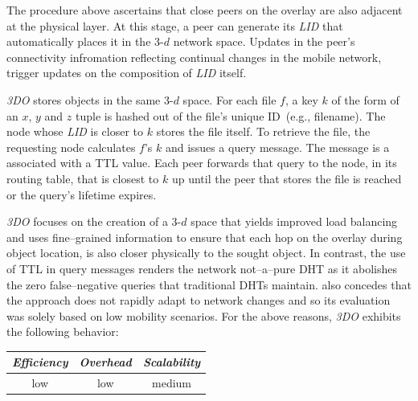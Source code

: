 The procedure above ascertains that close peers on the
overlay are also adjacent at the physical layer. 
At this stage, a peer can generate its \emph{LID}
that automatically places it in the $3$-$d$ network space.
Updates in the peer's connectivity infromation 
reflecting continual changes in the mobile network,
trigger updates on the composition of \emph{LID} itself.

\emph{3DO} stores objects in the same $3$-$d$ space. For each
file $f$, a key $k$ of the form of an $x$, $y$ and $z$ tuple
is hashed out of the file's unique ID~(e.g., filename).
The node whose \emph{LID} is closer to $k$ stores the
file itself.
To retrieve the file, the requesting node calculates $f$'s $k$
and issues a query message. The message is a associated with a TTL
value. Each peer forwards that query to the node,
in its routing table, that is closest to $k$ up until the peer
that stores the file is reached or the query's lifetime expires.

\emph{3DO} focuses on
the creation of a $3$-$d$ space that yields improved load balancing 
and uses fine--grained information to ensure
that each hop on the overlay during object location, 
is also closer physically to the sought object.
In contrast, the use of TTL in query messages
renders the network not--a--pure DHT as it abolishes 
the zero false--negative queries that traditional DHTs maintain.
\cite{AOS2014} also concedes that the approach
does not rapidly adapt to network changes and so
its evaluation was solely based on low mobility scenarios. 
For the above reasons, \emph{3DO} exhibits the following behavior:
\begin{center}
{\footnotesize
\begin{tabular}{ccc}
\emph{Efficiency} & \emph{Overhead} & \emph{Scalability} \\
\hline
% 
low &
% 
low &
% 
medium
\end{tabular}
}
\end{center}


